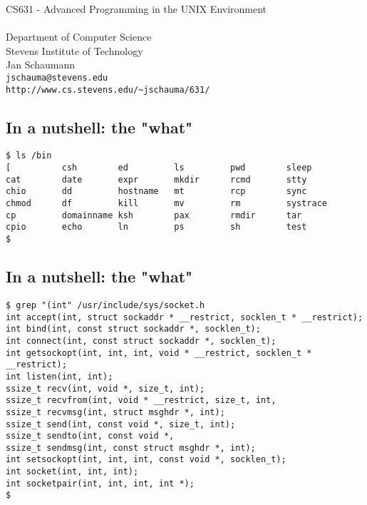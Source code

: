 \documentclass[xga]{xdvislides}
\begin{document}
\setfontphv

\lhead{\slidetitle}
\cfoot{\relax}
\rfoot{\Gray{\today}}

\vspace*{\fill}
\begin{center}
	\Hugesize
		CS631 - Advanced Programming in the UNIX Environment\\ [1em]
	\hspace*{5mm}\blueline\\ [1em]
	\Normalsize
		Department of Computer Science\\
		Stevens Institute of Technology\\
		Jan Schaumann\\
		\verb+jschauma@stevens.edu+\\
		\verb+http://www.cs.stevens.edu/~jschauma/631/+
\end{center}
\vspace*{\fill}

\subsection{In a nutshell: the "what"}
\begin{verbatim}
$ ls /bin
[          csh        ed         ls         pwd        sleep
cat        date       expr       mkdir      rcmd       stty
chio       dd         hostname   mt         rcp        sync
chmod      df         kill       mv         rm         systrace
cp         domainname ksh        pax        rmdir      tar
cpio       echo       ln         ps         sh         test
$
\end{verbatim}

\subsection{In a nutshell: the "what"}
\begin{verbatim}
$ grep "(int" /usr/include/sys/socket.h
int	accept(int, struct sockaddr * __restrict, socklen_t * __restrict);
int	bind(int, const struct sockaddr *, socklen_t);
int	connect(int, const struct sockaddr *, socklen_t);
int	getsockopt(int, int, int, void * __restrict, socklen_t * __restrict);
int	listen(int, int);
ssize_t	recv(int, void *, size_t, int);
ssize_t	recvfrom(int, void * __restrict, size_t, int,
ssize_t	recvmsg(int, struct msghdr *, int);
ssize_t	send(int, const void *, size_t, int);
ssize_t	sendto(int, const void *,
ssize_t	sendmsg(int, const struct msghdr *, int);
int	setsockopt(int, int, int, const void *, socklen_t);
int	socket(int, int, int);
int	socketpair(int, int, int, int *);
$
\end{verbatim}
\end{document}
